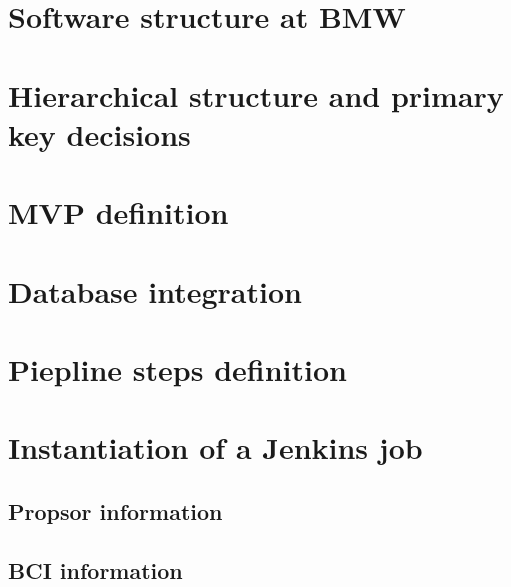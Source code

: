 \documentclass[../main.tex]{subfiles}
\begin{document}
\section{Software structure at BMW}
\section{Hierarchical structure and primary key decisions}
\section{MVP definition}
\section{Database integration}
\section{Piepline steps definition}
\section{Instantiation of a Jenkins job}
\subsection{Propsor information}
\subsection{BCI information}
\cleardoublepage
\end{document}
